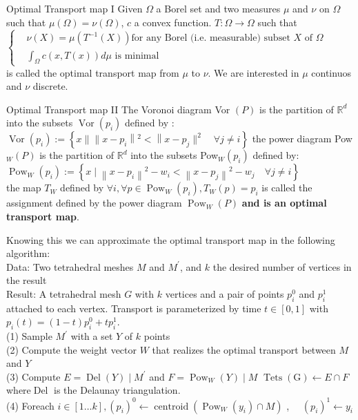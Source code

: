 \documentclass{beamer}
\begin{document}
\begin{frame}{Optimal Transport map I}
Given $\Omega$ a Borel set and two measures $\mu$ and $\nu$ on $\Omega$ such that $\mu(\Omega)=\nu(\Omega)$, $c$ a convex function.
 $T: \Omega \rightarrow \Omega$ such that $\begin{cases} & \nu(X)=\mu(T^{-1}(X)) \text{for any Borel (i.e. measurable) subset $X$ of $\Omega$}\\  & \int_{\Omega} c(x, T(x)) d \mu \text { is minimal }\end{cases}$\\ is called the optimal transport map from $\mu$ to $\nu$.
We are interested in $\mu$ continuos and $\nu$ discrete.
\end{frame}
\begin{frame}{Optimal Transport map II}
The Voronoi diagram Vor $(P)$ is the partition of $\mathbb{R}^{d}$ into the subsets $\operatorname{Vor}\left(p_{i}\right)$ defined by :
$\operatorname{Vor}\left(p_{i}\right):=\left\{x\|\| x-p_{i}\left\|^{2}<\right\| x-p_{j} \|^{2} \quad \forall j \neq i\right\}$
the power diagram Pow$_{W}(P)$ is the partition of $\mathbb{R}^{d}$ into the subsets Pow$_{W}\left(p_{i}\right)$ defined by:\\
$\operatorname{Pow}_{W}\left(p_{i}\right):=\left\{x \mid\left\|x-p_{i}\right\|^{2}-w_{i}<\left\|x-p_{j}\right\|^{2}-w_{j} \quad \forall j \neq i\right\}$\\
the map $T_{W}$ defined by $\forall i, \forall p \in \operatorname{Pow}_{W}\left(p_{i}\right), T_{W}(p)=p_{i}$ is called the assignment defined by the power diagram $\operatorname{Pow}_{W}(P)$ \textbf{and is an optimal transport map}.
\end{frame}
\begin{frame}
Knowing this we can approximate the optimal transport map in the following algorithm:\\
Data: Two tetrahedral meshes $M$ and $M^{\prime}$, and $k$ the desired number of vertices in the result\\
Result: A tetrahedral mesh $G$ with $k$ vertices and a pair of points $p_{i}^{0}$ and $p_{i}^{1}$ attached to each vertex. Transport is parameterized by time $t \in[0,1]$ with $p_{i}(t)=(1-t) p_{i}^{0}+t p_{i}^{1}$.\\
(1) Sample $M^{\prime}$ with a set $Y$ of $k$ points\\
(2) Compute the weight vector $W$ that realizes the optimal transport between $M$ and $Y$\\
(3) Compute $E=\operatorname{Del}(Y) \mid M^{\prime}$ and $F=\operatorname{Pow}_{W}(Y) \mid M $ $\operatorname{Tets}(\mathrm{G}) \leftarrow E \cap F$ where$ \operatorname{Del}$ is the Delaunay triangulation.\\
(4) Foreach $i \in[1 \ldots k],\left(p_{i}\right)^{0} \leftarrow \operatorname{centroid}\left(\operatorname{Pow}_{W}\left(y_{i}\right) \cap M\right) $ , $\quad\left(p_{i}\right)^{1} \leftarrow y_{i}$\\
\end{frame}
\end{document}
